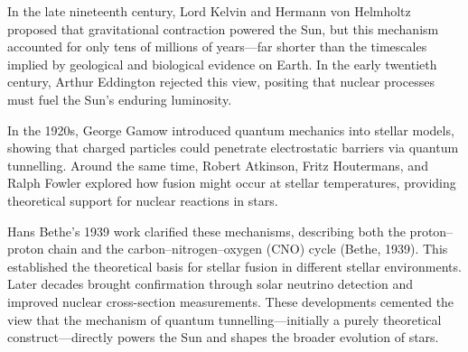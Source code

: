 \begin{historical}
In the late nineteenth century, Lord Kelvin and Hermann von Helmholtz proposed that gravitational contraction powered the Sun, but this mechanism accounted for only tens of millions of years—far shorter than the timescales implied by geological and biological evidence on Earth. In the early twentieth century, Arthur Eddington rejected this view, positing that nuclear processes must fuel the Sun’s enduring luminosity.

In the 1920s, George Gamow introduced quantum mechanics into stellar models, showing that charged particles could penetrate electrostatic barriers via quantum tunnelling. Around the same time, Robert Atkinson, Fritz Houtermans, and Ralph Fowler explored how fusion might occur at stellar temperatures, providing theoretical support for nuclear reactions in stars. 

Hans Bethe’s 1939 work clarified these mechanisms, describing both the proton–proton chain and the carbon–nitrogen–oxygen (CNO) cycle (Bethe, 1939). This established the theoretical basis for stellar fusion in different stellar environments. Later decades brought confirmation through solar neutrino detection and improved nuclear cross-section measurements. These developments cemented the view that the mechanism of quantum tunnelling—initially a purely theoretical construct—directly powers the Sun and shapes the broader evolution of stars.
\end{historical}